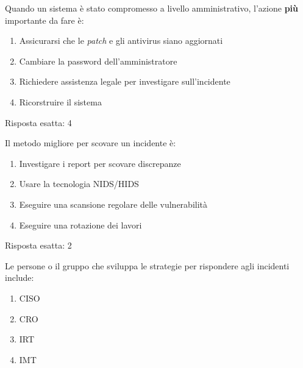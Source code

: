 \begin{Exercise} [
  title={Quiz},
  label={esIRBC3}
  ]

  \Question Quando un sistema \`e stato compromesso a livello amministrativo,
l'azione \textbf{pi\`u} importante da fare \`e:
\begin{enumerate}
 \item Assicurarsi che le \textit{patch} e gli antivirus siano aggiornati
 \item Cambiare la password dell'amministratore
 \item Richiedere assistenza legale per investigare sull'incidente
 \item Ricorstruire il sistema
\end{enumerate}
\end{Exercise}

\begin{Answer} [
  ref={esIRBC3},
  number={3}
  ]

  \Question Risposta esatta: 4
\end{Answer}


\begin{Exercise} [
  title={Quiz},
  label={esIRBC4}
  ]

  \Question Il metodo migliore per scovare un incidente \`e:
  \begin{enumerate}
   \item Investigare i report per scovare discrepanze
   \item Usare la tecnologia NIDS/HIDS
   \item Eseguire una scansione regolare delle vulnerabilit\`a
   \item Eseguire una rotazione dei lavori
  \end{enumerate}
\end{Exercise}

\begin{Answer} [
  ref={esIRBC4},
  number={4}
  ]

  \Question Risposta esatta: 2
\end{Answer}


\begin{Exercise} [
  title={Quiz},
  label={esIRBC5}
  ]

  \Question Le persone o il gruppo che sviluppa le strategie per rispondere
agli incidenti include:
\begin{enumerate}
 \item CISO
 \item CRO
 \item IRT
 \item IMT
\end{enumerate}

\end{Exercise}

